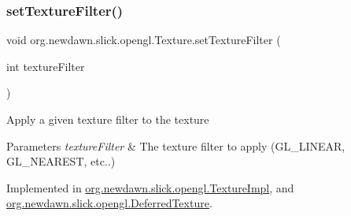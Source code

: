\mbox{\label{interfaceorg_1_1newdawn_1_1slick_1_1opengl_1_1_texture_ad55f0e2e39587c24e3e1b149ac8b16db}} 
\subsubsection{\texorpdfstring{set\+Texture\+Filter()}{setTextureFilter()}}
{\footnotesize\ttfamily void org.\+newdawn.\+slick.\+opengl.\+Texture.\+set\+Texture\+Filter (\begin{DoxyParamCaption}\item[{int}]{texture\+Filter }\end{DoxyParamCaption})}

Apply a given texture filter to the texture


\begin{DoxyParams}{Parameters}
{\em texture\+Filter} & The texture filter to apply (G\+L\+\_\+\+L\+I\+N\+E\+AR, G\+L\+\_\+\+N\+E\+A\+R\+E\+ST, etc..) \\
\hline
\end{DoxyParams}


Implemented in \mbox{\hyperlink{classorg_1_1newdawn_1_1slick_1_1opengl_1_1_texture_impl_a83c5c6547a8afa2706a5465988a7261e}{org.\+newdawn.\+slick.\+opengl.\+Texture\+Impl}}, and \mbox{\hyperlink{classorg_1_1newdawn_1_1slick_1_1opengl_1_1_deferred_texture_a8971cbfe44dea125bcf098eee07d974a}{org.\+newdawn.\+slick.\+opengl.\+Deferred\+Texture}}.

